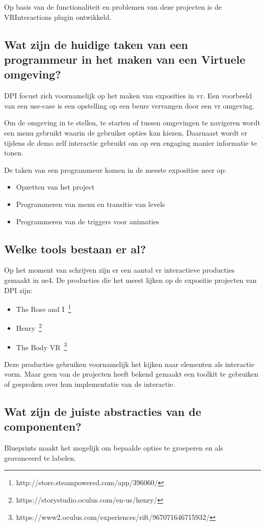 Op basis van de functionaliteit en problemen van deze projecten is de VRInteractions plugin ontwikkeld.

\subsection{Wat zijn de huidige taken van een programmeur in het maken van een Virtuele omgeving?}
DPI focust zich voornamelijk op het maken van exposities in \gls{vr}. Een voorbeeld van een use-case is een opstelling op een beurs vervangen door een \gls{vr} omgeving.

Om de omgeving in te stellen, te starten of tussen omgevingen te navigeren wordt een menu gebruikt waarin de gebruiker opties kan kiezen. Daarnaast wordt er tijdens de demo zelf interactie gebruikt om op een engaging manier informatie te tonen. 

De taken van een programmeur komen in de meeste exposities neer op:

\begin{itemize}
	\item Opzetten van het project
	\item Programmeren van menu en transitie van levels
	\item Programmeren van de triggers voor animaties 
\end{itemize}


\subsection{Welke tools bestaan er al?}
Op het moment van schrijven zijn er een aantal \gls{vr} interactieve producties gemaakt in \gls{ue4}. De producties die het meest lijken op de expositie projecten van DPI zijn:
 
\begin{itemize}
	\item The Rose and I~\footnote{http://store.steampowered.com/app/396060/}
	\item Henry~\footnote{https://storystudio.oculus.com/en-us/henry/}
	\item The Body VR~\footnote{https://www2.oculus.com/experiences/rift/967071646715932/}
\end{itemize}

Deze producties gebruiken voornamelijk het kijken naar elementen als interactie vorm. Maar geen van de projecten heeft bekend gemaakt een toolkit te gebruiken of gesproken over hun implementatie van de interactie.

\subsection{Wat zijn de juiste abstracties van de componenten?}
Blueprints maakt het mogelijk om bepaalde opties te groeperen en als geavanceerd te labelen. 

